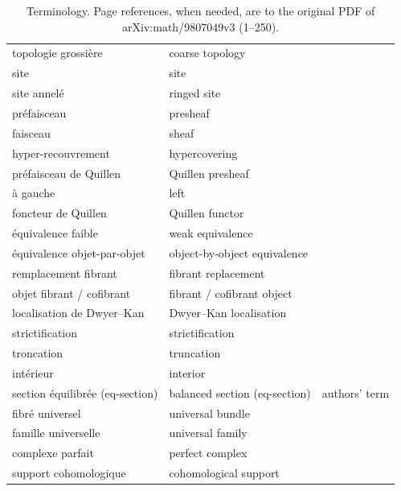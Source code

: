 \begin{table}[htbp]
\begin{tabular}{p{} p{} p{}}
    topologie grossière           & coarse topology                & \\
    site                          & site                           & \\
    site annelé                   & ringed site                    & \\
    préfaisceau                   & presheaf                       & \\
    faisceau                      & sheaf                          & \\
    hyper-recouvrement            & hypercovering                  & \\
    préfaisceau de Quillen        & Quillen presheaf               & \\
    \quad à gauche                & \quad left                     & \\
    foncteur de Quillen           & Quillen functor                & \\
    équivalence faible            & weak equivalence                & \\
    équivalence objet-par-objet   & object-by-object equivalence   & \\
    remplacement fibrant          & fibrant replacement            & \\
    objet fibrant / cofibrant     & fibrant / cofibrant object     & \\
    localisation de Dwyer--Kan    & Dwyer--Kan localisation        & \\
    strictification               & strictification                & \\
    troncation                    & truncation                     & \\
    intérieur                     & interior                       & \\
    section équilibrée (eq-section) & balanced section (eq-section) & authors' term\\
    fibré universel               & universal bundle               & \\
    famille universelle           & universal family               & \\
    complexe parfait              & perfect complex                & \\
    support cohomologique         & cohomological support          & \\
    \hline
  \end{tabular}
  \caption{Terminology.  Page references, when needed, are to the original
  PDF of arXiv:math/9807049v3 (1--250).}
  \label{tab:terminology}
\end{table}

